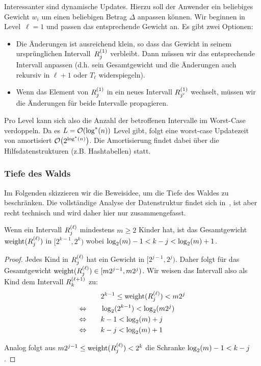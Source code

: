 Interessanter sind dynamische Updates.
Hierzu soll der Anwender ein beliebiges Gewicht $w_i$ um einen beliebigen Betrag $\Delta$ anpassen können.
Wir beginnen in Level~$\ell=1$ und passen das entsprechende Gewicht an.
Es gibt zwei Optionen:
\begin{itemize}
    \item Die Änderungen ist ausreichend klein, so dass das Gewicht in seinem ursprünglichen Intervall~$R^{(1)}_{j}$ verbleibt.
          Dann müssen wir das entsprechende Intervall anpassen (d.h. sein Gesamtgewicht und die Änderungen auch rekursiv in $\ell +1$ oder $T_\ell$ widerspiegeln).


    \item Wenn das Element von $R^{(1)}_{j}$ in ein neues Intervall $R^{(1)}_{j'}$ wechselt, müssen wir die Änderungen für beide Intervalle propagieren.
\end{itemize}

Pro Level kann sich also die Anzahl der betroffenen Intervalle im Worst-Case verdoppeln.
Da es $L = \mathcal{O}\!\left(\log^*(n)\right)$ Level gibt, folgt eine worst-case Updatezeit von amortisiert $\mathcal{O}\!\left(2^{\log^*(n)}\right)$.
Die Amortisierung findet dabei über die Hilfsdatenstrukturen (z.B. Hashtabellen) statt.

\subsubsection{Tiefe des Walds}
Im Folgenden skizzieren wir die Beweisidee, um die Tiefe des Waldes zu beschränken.
Die vollständige Analyse der Datenstruktur findet sich in~\cite{DBLP:journals/mst/MatiasVN03}, ist aber recht technisch und wird daher hier nur zusammengefasst.

\begin{lemma}\label{lem:nachfolger_intervall}
    Wenn ein Intervall $R^{(\ell)}_{j}$ mindestens $m \ge 2$ Kinder hat,
    ist das Gesamtgewicht $\mathrm{weight}(R^{(\ell)}_{j})$ in $[2^{k-1}, 2^k)$ wobei $\log_2(m) - 1 < k - j < \log_2(m) + 1$.
\end{lemma}
\begin{proof}
    Jedes Kind in $R^{(\ell)}_{j}$ hat ein Gewicht in $[2^{j-1}, 2^j)$.
    Daher folgt für das Gesamtgewicht $\mathrm{weight}(R^{(\ell)}_{j}) \in [m2^{j-1}, m2^j)$.
    Wir weisen das Intervall also als Kind dem Intervall $R^{(\ell+1)}_{k}$ zu:
    \begin{align}
                               & 2^{k-1} \le \mathrm{weight}(R^{(\ell)}_{j}) < m2^j \\
        \Leftrightarrow \qquad & \log_2(2^{k-1}) < \log_2(m2^{j})        \\
        \Leftrightarrow \qquad & k - 1 < \log_2(m) + j                \\
        \Leftrightarrow \qquad & k - j < \log_2(m) + 1
    \end{align}

    \noindent
    Analog folgt aus $m2^{j-1} \le \mathrm{weight}(R^{(\ell)}_{j}) < 2^k$ die Schranke $\log_2(m) - 1 < k - j$.
\end{proof}

